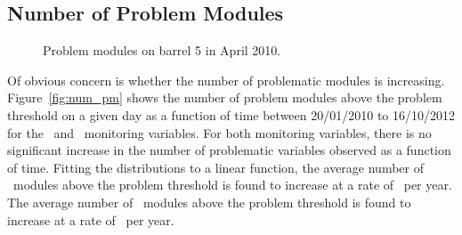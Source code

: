 \subsection{Number of Problem Modules}

\begin{figure}
	\centering


	\caption{Problem modules on barrel 5 in April 2010.}
	\label{fig:pm_april}
\end{figure}
 
Of obvious concern is whether the number of problematic modules is increasing.
Figure~\ref{fig:num_pm} shows the number of problem modules above the problem
threshold on a given day as a function of time between 20/01/2010 to 16/10/2012
for the \deltat\ and \tdiff\ monitoring variables. For both monitoring
variables, there is no significant increase in the number of problematic
variables observed as a function of time. Fitting the distributions to a
linear function, the average number of \tdiff\ modules above the problem
threshold is found to increase at a rate of \NumHighTdiffModulesIncreaseRate\
per year. The average number of \deltat\ modules above the problem threshold
is found to increase at a rate of \NumHighDeltaTModulesIncreaseRate\ per year.

